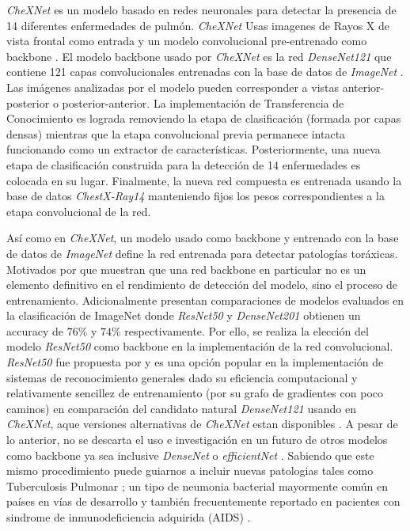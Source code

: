 {\textit{CheXNet} es un modelo basado en redes neuronales para detectar la presencia de 14 diferentes
enfermedades de pulmón. \textit{CheXNet} Usas imagenes de Rayos X de vista frontal como entrada y
un modelo convolucional pre-entrenado como backbone \cite{rajpurkar2018deep}. El modelo backbone usado
por \textit{CheXNet} es la red \textit{DenseNet121} \cite{huang2017densely} que contiene 121 capas
convolucionales entrenadas con la base de datos de \textit{ImageNet} \cite{ILSVRC15}. Las imágenes
analizadas por el modelo pueden corresponder a vistas anterior-posterior o posterior-anterior. La
implementación de Transferencia de Conocimiento es lograda removiendo la etapa de clasificación
(formada por capas densas) mientras que la etapa convolucional previa permanece intacta funcionando
como un extractor de características. Posteriormente, una nueva etapa de clasificación construida
para la detección de 14 enfermedades es colocada en su lugar. Finalmente, la nueva red compuesta
es entrenada usando la base de datos \textit{ChestX-Ray14} manteniendo fijos los pesos
correspondientes a la etapa convolucional de la red.

Así como en \textit{CheXNet}, un modelo usado como backbone y entrenado con la base de datos de
\textit{ImageNet} define la red entrenada para detectar patologías toráxicas. Motivados por
\citeauthor{bressem2020comparing, shazia2021comparative} que muestran que una red backbone en
particular no es un elemento definitivo en el rendimiento de detección del modelo, sino el proceso
de entrenamiento. Adicionalmente \citeauthor{huang2017densely, luo2020comparison} presentan
comparaciones de modelos evaluados en la clasificación de ImageNet donde \textit{ResNet50} y
\textit{DenseNet201} obtienen un accuracy de $76\%$ y $74\%$ respectivamente. Por ello, se realiza
la elección del modelo \textit{ResNet50} como backbone en la implementación de la red convolucional.
\textit{ResNet50} fue propuesta por \citeauthor{he2016deep} y es una opción popular en la
implementación de sistemas de reconocimiento generales dado su eficiencia computacional y relativamente
sencillez de entrenamiento (por su grafo de gradientes con poco caminos) en comparación del candidato
natural \textit{DenseNet121} usando en \textit{CheXNet}, aque versiones alternativas de
\textit{CheXNet} estan disponibles \cite{chexnet_code}. A pesar de lo anterior, no se descarta el uso
e investigación en un futuro de otros modelos como backbone ya sea inclusive \textit{DenseNet} o
\textit{efficientNet} \cite{tan2019efficientnet}. Sabiendo que este mismo procedimiento puede
guiarnos a incluir nuevas patologias tales como Tuberculosis Pulmonar \cite{stirenko2018chest}; un
tipo de neumonia bacterial mayormente común en países en vías de desarrollo y también frecuentemente
reportado en pacientes con sindrome de inmunodeficiencia adquirida (AIDS) \cite{matsuura2018tuberculous}.

}
